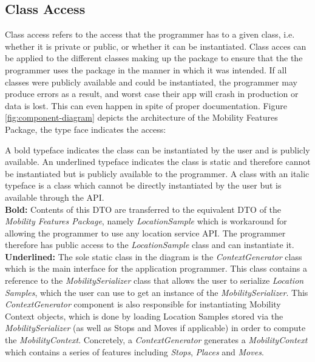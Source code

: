 \subsection{Class Access}
 Class access refers to the access that the programmer has to a given class, i.e. whether it is private or public, or whether it can be instantiated. Class acces can be applied to the different classes making up the package to ensure that the the programmer uses the package in the manner in which it was intended. If all classes were publicly available and could be instantiated, the programmer may produce errors as a result, and worst case their app will crash in production or data is lost. This can even happen in spite of proper documentation. Figure \ref{fig:component-diagram} depicts the architecture of the Mobility Features Package, the type face indicates the access: 
 
 A bold typeface indicates the class can be instantiated by the user and is publicly available. An underlined typeface indicates the class is static and therefore cannot be instantiated but is publicly available to the programmer. A class with an italic typeface is a class which cannot be directly instantiated by the user but is available through the API. \\
 
\textbf{Bold:} Contents of this DTO are transferred to the equivalent DTO of the \textit{Mobility Features Package}, namely \textit{LocationSample} which is workaround for allowing the programmer to use any location service API. The programmer therefore has public access to the \textit{LocationSample} class and can instantiate it.\\

\textbf{Underlined:} The sole static class in the diagram is the \textit{ContextGenerator} class which is the main interface for the application programmer. This class contains a reference to the \textit{MobilitySerializer} class that allows the user to serialize \textit{Location Samples}, which the user can use to get an instance of the \textit{MobilitySerializer}. This \textit{ContextGenerator} component is also responsible for instantiating  Mobility Context objects, which is done by loading Location Samples stored via the \textit{MobilitySerializer} (as well as Stops and Moves if applicable) in order to compute the \textit{MobilityContext}. Concretely, a \textit{ContextGenerator} generates a \textit{MobilityContext} which contains a series of features including \textit{Stops}, \textit{Places} and \textit{Moves}.\\

